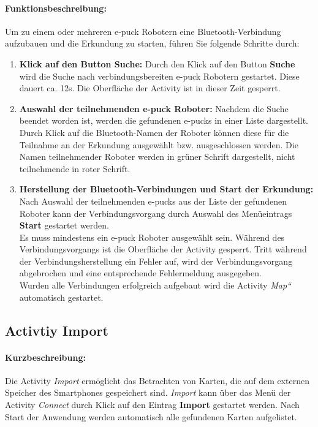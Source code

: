 \documentclass[10pt,a4paper]{article}
\begin{document}
		\paragraph*{Funktionsbeschreibung:}
		Um zu einem oder mehreren e-puck Robotern eine Bluetooth-Verbindung aufzubauen und die Erkundung zu starten, f\"uhren Sie folgende Schritte
		durch:
		\begin{enumerate}
			\item \textbf{Klick auf den Button Suche:} Durch den Klick auf den Button \textbf{Suche} wird die Suche nach verbindungsbereiten e-puck
			Robotern gestartet. Diese dauert ca. 12s. Die Oberfl\"ache der Activity ist in dieser Zeit gesperrt.
			\item \textbf{Auswahl der teilnehmenden e-puck Roboter:} Nachdem die Suche beendet worden ist, werden die gefundenen e-pucks in einer
			Liste dargestellt. Durch Klick auf die Bluetooth-Namen der Roboter k\"onnen diese für die Teilnahme an der Erkundung ausgew\"ahlt bzw.
			ausgeschlossen werden. Die Namen teilnehmender Roboter werden in gr\"uner Schrift dargestellt, nicht teilnehmende in roter Schrift.
			\item \textbf{Herstellung der Bluetooth-Verbindungen und Start der Erkundung:} Nach Auswahl der teilnehmenden e-pucks aus der Liste der
			gefundenen Roboter kann der Verbindungsvorgang durch Auswahl des Men\"ueintrags \textbf{Start} gestartet werden. \\ 
			Es muss mindestens ein e-puck Roboter ausgew\"ahlt sein. Während des Verbindungsvorgangs ist die Oberfl\"ache der Activity gesperrt.
			Tritt w\"ahrend der Verbindungsherstellung ein Fehler auf, wird der Verbindungsvorgang abgebrochen und eine entsprechende Fehlermeldung
			ausgegeben. \\
			Wurden alle Verbindungen erfolgreich aufgebaut wird die Activity \textit{Map“} automatisch gestartet.
		\end{enumerate}
		
	\subsection{Activtiy Import}
		\paragraph*{Kurzbeschreibung:}
		Die Activity \textit{Import} erm\"oglicht das Betrachten von Karten, die auf dem externen Speicher des Smartphones gespeichert sind.
		\textit{Import} kann über das Men\"u der Activity \textit{Connect} durch Klick auf den Eintrag \textbf{Import} gestartet werden. Nach Start
		der Anwendung werden automatisch alle gefundenen Karten aufgelistet. 
\end{document}
